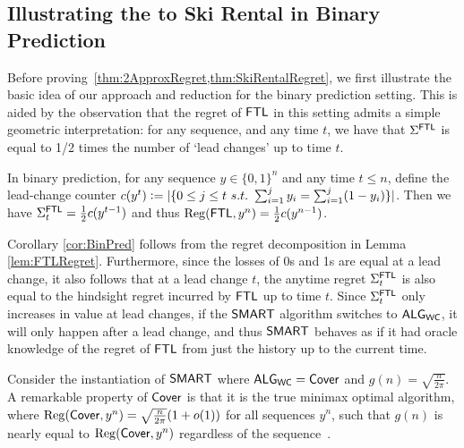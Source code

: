 \subsection{Illustrating the  to Ski Rental in Binary Prediction}
\label{ssec:binary}

Before proving~\cref{thm:2ApproxRegret,thm:SkiRentalRegret}, we first illustrate the basic idea of our approach and reduction for the binary prediction setting. This is aided by the observation that the regret of $\mathsf{FTL}$ in this setting admits a simple geometric interpretation: for any sequence, and any time $t$, we have that $\Sigma^{\mathsf{FTL}}$ is equal to 1/2 times the number of `lead changes' up to time $t$.
\begin{corollary} \label{cor:BinPred}
In binary prediction, for any sequence $y\in\{0,1\}^n$ and any time $t\leq n$, define the lead-change counter
$c(y^t) \mathrel{\mathop{:}}= |\{0 \le j \le t ~s.t.~ \sum_{i=1}^j y_i = \sum_{i=1}^j (1-y_i)\}|$.
Then we have $\Sigma^{\mathsf{FTL}}_t = \frac12 c(y^{t-1})$ and thus $\mathrm{Reg}(\mathsf{FTL}, y^n) = \frac12 c(y^{n-1})$. 
\end{corollary}
Corollary \ref{cor:BinPred} follows from the regret decomposition in Lemma \ref{lem:FTLRegret}. Furthermore, since the losses of 0s and 1s are equal at a lead change, it also follows that at a lead change $t$, the anytime regret $\Sigma^{\mathsf{FTL}}_t$ is also equal to the hindsight regret incurred by $\mathsf{FTL}$ up to time $t$. Since $\Sigma^{\mathsf{FTL}}_t$ only increases in value at lead changes, if the $\mathsf{SMART}$ algorithm switches to $\mathsf{ALG}_{\mathsf{WC}}$, it will only happen after a lead change, and thus $\mathsf{SMART}$ behaves as if it had oracle knowledge of the regret of $\mathsf{FTL}$ from just the history up to the current time.

Consider the instantiation of $\mathsf{SMART}$ where $\mathsf{ALG}_{\mathsf{WC}} = \mathsf{Cover}$ and $g(n) = \sqrt{\frac{n}{2 \pi}}$. A remarkable property of $\mathsf{Cover}$ is that it is the true minimax optimal algorithm, where $\mathrm{Reg}(\mathsf{Cover},y^n) = \sqrt{\frac{n}{2 \pi}} (1+o(1))$ for all sequences $y^n$, such that $g(n)$ is nearly equal to $\mathrm{Reg}(\mathsf{Cover},y^n)$ regardless of the sequence~\citep{Cover1966}. 

